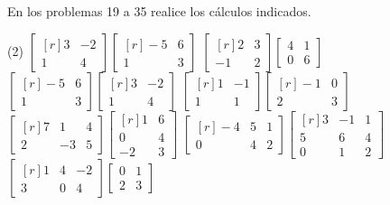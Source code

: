 En los problemas 19 a 35 realice los cálculos indicados.
\begin{tasks}[
    start=19,
    style=enumerate,
    label-offset = 2.9mm,
    ](2)
    \task $\begin{bmatrix*}[r]3 & -2 \\ 1 & 4\end{bmatrix*}\begin{bmatrix*}[r]-5 & 6 \\ 1 & 3\end{bmatrix*}$
    \task $\begin{bmatrix*}[r]2 & 3 \\ -1 & 2\end{bmatrix*}\begin{bmatrix*}4 & 1 \\ 0 & 6\end{bmatrix*}$
    \task $\begin{bmatrix*}[r]-5 & 6 \\ 1 & 3\end{bmatrix*}\begin{bmatrix*}[r]3 & -2 \\ 1 & 4\end{bmatrix*}$
    \task $\begin{bmatrix*}[r]1 & -1 \\ 1 & 1\end{bmatrix*}\begin{bmatrix*}[r]-1 & 0 \\ 2 & 3\end{bmatrix*}$
    \task $\begin{bmatrix*}[r]7 & 1 & 4 \\ 2 & -3 & 5\end{bmatrix*}\begin{bmatrix*}[r]1 & 6 \\ 0 & 4 \\ -2 & 3\end{bmatrix*}$
    \task $\begin{bmatrix*}[r]-4 & 5 & 1 \\ 0 & 4 & 2\end{bmatrix*}\begin{bmatrix*}[r]3 & -1 & 1 \\ 5 & 6 & 4 \\ 0 & 1 & 2\end{bmatrix*}$
    \task $\begin{bmatrix*}[r]1 & 4 & -2 \\ 3 & 0 & 4\end{bmatrix*}\begin{bmatrix*}0 & 1 \\ 2 & 3\end{bmatrix*}$

\end{tasks}
